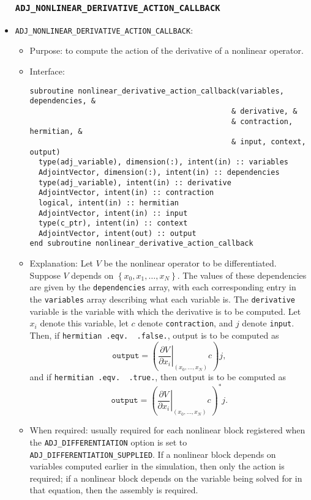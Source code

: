\documentclass[10pt,authoryear]{elsarticle}
\begin{document}
\begin{itemize}
\subsubsection{\texttt{ADJ\_NONLINEAR\_DERIVATIVE\_ACTION\_CALLBACK}}
\item \texttt{ADJ\_NONLINEAR\_DERIVATIVE\_ACTION\_CALLBACK}:
 \begin{itemize} 
 \item Purpose: to compute the action of the derivative of a nonlinear operator.
 \item Interface:
\begin{verbatim}
subroutine nonlinear_derivative_action_callback(variables, dependencies, &
                                              & derivative, &
                                              & contraction, hermitian, &
                                              & input, context, output)
  type(adj_variable), dimension(:), intent(in) :: variables
  AdjointVector, dimension(:), intent(in) :: dependencies
  type(adj_variable), intent(in) :: derivative
  AdjointVector, intent(in) :: contraction
  logical, intent(in) :: hermitian
  AdjointVector, intent(in) :: input
  type(c_ptr), intent(in) :: context
  AdjointVector, intent(out) :: output
end subroutine nonlinear_derivative_action_callback
\end{verbatim}
 \item Explanation: Let $V$ be the nonlinear operator to be differentiated. Suppose $V$ depends on $\left\{x_0, x_1, \dots, x_N\right\}$. The values of these
dependencies are given by the \texttt{dependencies} array, with each corresponding entry in the \texttt{variables} array describing what each variable is. The \texttt{derivative} variable
is the variable with which the derivative is to be computed. Let $x_i$ denote this variable, let $c$ denote \texttt{contraction}, and $j$ denote \texttt{input}. Then, if \texttt{hermitian .eqv. $\!\!\!\!\!\!\!$ .false.},
output is to be computed as
\begin{equation}
\texttt{output} = \left(\left.\frac{\partial V}{\partial x_i}\right|_{(x_0, \dots, x_N)}c\right)j, 
\end{equation}
and if \texttt{hermitian .eqv. $\!\!\!\!\!\!\!$ .true.}, then output is to be computed as
\begin{equation}
\texttt{output} = \left(\left.\frac{\partial V}{\partial x_i}\right|_{(x_0, \dots, x_N)}c\right)^{*}j. 
\end{equation}
 \item When required: usually required for each nonlinear block registered when the \newline\texttt{ADJ\_DIFFERENTIATION} option is set to \texttt{ADJ\_DIFFERENTIATION\_SUPPLIED}.
If a nonlinear block depends on variables computed earlier in the simulation, then only the action is required; if a nonlinear block depends on the variable being solved for in that equation,
then the assembly is required.
 \end{itemize}


\end{itemize}
\end{document}
